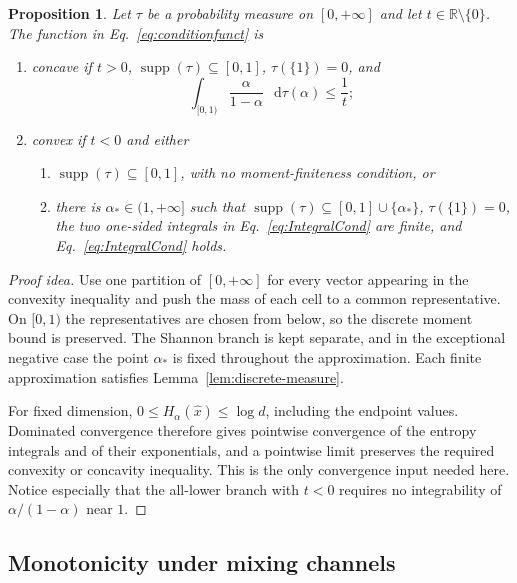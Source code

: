 \documentclass[11pt]{article}
\newtheorem{proposition}[theorem]{Proposition}
\theoremstyle{definition}
\newcommand{\R}{\mathbb{R}}
\def\d{\mathop{}\!\mathrm{d}}
\begin{document}
\begin{proposition}
\label{prop:sufficient-conditions}
Let $\tau$ be a probability measure on $[0,+\infty]$ and let
$t\in\R\setminus\{0\}$.  The function in Eq.~\eqref{eq:conditionfunct} is
\begin{enumerate}
\item concave if $t>0$,
$\operatorname{supp}(\tau)\subseteq[0,1]$, $\tau(\{1\})=0$, and
\begin{equation}
\int_{[0,1)}\frac{\alpha}{1-\alpha}\,\d\tau(\alpha)\leq\frac1t;
\end{equation}
\item convex if $t<0$ and either
  \begin{enumerate}[label=(\alph*)]
  \item $\operatorname{supp}(\tau)\subseteq[0,1]$, with no moment-finiteness
  condition, or
  \item there is $\alpha_*\in(1,+\infty]$ such that
  $\operatorname{supp}(\tau)\subseteq[0,1]\cup\{\alpha_*\}$,
  $\tau(\{1\})=0$, the two one-sided integrals in
  Eq.~\eqref{eq:IntegralCond} are finite, and Eq.~\eqref{eq:IntegralCond} holds.
  \end{enumerate}
\end{enumerate}
\end{proposition}

\begin{proof}[Proof idea]
Use one partition of $[0,+\infty]$ for every vector appearing in the convexity
inequality and push the mass of each cell to a common representative.  On
$[0,1)$ the representatives are chosen from below, so the discrete moment bound
is preserved.  The Shannon branch is kept separate, and in the exceptional
negative case the point $\alpha_*$ is fixed throughout the approximation.  Each
finite approximation satisfies Lemma~\ref{lem:discrete-measure}.

For fixed dimension, $0\leq H_\alpha(\hat{x})\leq\log d$, including the endpoint
values.  Dominated convergence therefore gives pointwise convergence of the
entropy integrals and of their exponentials, and a pointwise limit preserves the
required convexity or concavity inequality.  This is the only convergence input
needed here.  Notice especially that the all-lower branch with $t<0$ requires no
integrability of $\alpha/(1-\alpha)$ near $1$.
\end{proof}

\subsection{Monotonicity under mixing channels}
\label{sec:mixing-channels}
\end{document}
